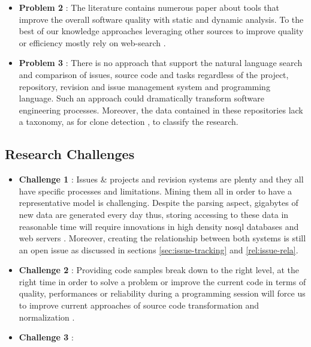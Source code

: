 \begin{itemize}
	\item {\bf Problem 2} : The literature contains numerous paper about tools that improve the overall software quality with static \cite{Dangel2000, burn2003checkstyle,Hovemeyer2007,Moha2010} and dynamic \cite{Nayrolles,Nayrolles2013a,Palma2013} analysis. To the best of our knowledge approaches leveraging other sources to improve quality or efficiency mostly rely on web-search \cite{Brandt2009,Rahman2013,Montandon2013}.

	\item {\bf Problem 3} : There is no approach that support the natural language search and comparison of issues, source code and tasks regardless of the project, repository, revision and issue management system and programming language. Such an approach could dramatically transform software engineering processes. Moreover, the data contained in these repositories lack a taxonomy, as for clone detection \cite{CoryKapser}, to classify the research.
\end{itemize}

\subsection{Research Challenges\label{sec:challenges}}

\begin{itemize}
	\item {\bf Challenge 1} : Issues \& projects and revision systems are plenty and they all have specific processes and limitations. Mining them all in order to have a representative model is challenging. Despite the parsing aspect, gigabytes of new data are generated every day thus, storing accessing to these data in reasonable time will require innovations in high density nosql databases \cite{Nayrolles2014b} and web servers \cite{Nayrolles2013b,Nayrolles2014c}. Moreover, creating the relationship between both systems is still an open issue as discussed in sections \ref{sec:issue-tracking} and \ref{rel:issue-rela}.

	\item {\bf Challenge 2} : Providing code samples break down to the right level, at the right time in order to solve a problem  or improve the current code in terms of quality, performances or reliability during a programming session will force us to improve current approaches of source code transformation and normalization \cite{Cordy2006a, Cordy2006,Roy2008,Cordy2011}.
	\item {\bf Challenge 3} :
\end{itemize}


